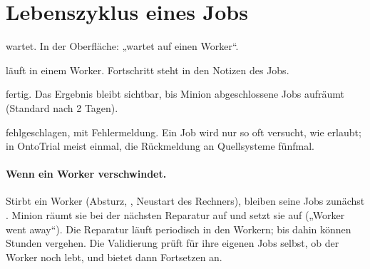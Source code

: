 \documentclass[11pt,a4paper,parskip=half-,headings=standardclasses,toc=bibliography,open=any]{scrreprt}
\begin{document}
\section{Lebenszyklus eines Jobs}

\begin{center}
\end{center}

\begin{description}[style=nextline,leftmargin=1.5em]
  \item[inactive] wartet. In der Oberfläche: „wartet auf einen Worker“.
  \item[active] läuft in einem Worker. Fortschritt steht in den Notizen des Jobs.
  \item[finished] fertig. Das Ergebnis bleibt sichtbar, bis Minion abgeschlossene Jobs aufräumt (Standard nach 2 Tagen).
  \item[failed] fehlgeschlagen, mit Fehlermeldung. Ein Job wird nur so oft versucht, wie  erlaubt; in OntoTrial meist einmal, die Rückmeldung an Quellsysteme fünfmal.
\end{description}

\paragraph{Wenn ein Worker verschwindet.} Stirbt ein Worker (Absturz, , Neustart des Rechners), bleiben seine Jobs zunächst . Minion räumt sie bei der nächsten Reparatur auf und setzt sie auf  („Worker went away“). Die Reparatur läuft periodisch in den Workern; bis dahin können Stunden vergehen. Die Validierung prüft für ihre eigenen Jobs selbst, ob der Worker noch lebt, und bietet dann Fortsetzen an.
\end{document}
